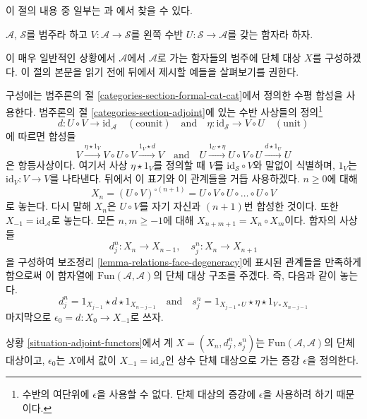\noindent
이 절의 내용 중 일부는 \cite[부록 1]{Godement}과
\cite[I 1.5]{cotangent}에서 찾을 수 있다.

\begin{situation}
\label{situation-adjoint-functors}
$\mathcal{A}$, $\mathcal{S}$를 범주라 하고
$V : \mathcal{A} \to \mathcal{S}$를 왼쪽 수반
$U : \mathcal{S} \to \mathcal{A}$를 갖는 함자라 하자.
\end{situation}

\noindent
이 매우 일반적인 상황에서 $\mathcal{A}$에서 $\mathcal{A}$로 가는
함자들의 범주에 단체 대상 $X$를 구성하겠다. 이 절의 본문을 읽기 전에
뒤에서 제시할 예들을 살펴보기를 권한다.

\medskip\noindent
구성에는 범주론의 절 \ref{categories-section-formal-cat-cat}에서 정의한
수평 합성을 사용한다. 범주론의 절 \ref{categories-section-adjoint}에
있는 수반 사상들의 정의\footnote{수반의 여단위에 $\epsilon$을 사용할
수 없다. 단체 대상의 증강에 $\epsilon$을 사용하려 하기 때문이다.}
$$
d : U \circ V \to \text{id}_\mathcal{A} \quad (\text{counit})
\quad\text{and}\quad
\eta : \text{id}_\mathcal{S} \to V \circ U \quad (\text{unit})
$$
에 따르면 합성들
\begin{equation}
\label{equation-composition}
V \xrightarrow{\eta \star 1_V} V \circ U \circ V \xrightarrow{1_V \star d} V
\quad\text{and}\quad
U \xrightarrow{1_U \star \eta} U \circ V \circ U \xrightarrow{d \star 1_U} U
\end{equation}
은 항등사상이다. 여기서 사상 $\eta \star 1_V$를 정의할 때 $V$를
$\text{id}_\mathcal{S} \circ V$와 말없이 식별하며, $1_V$는
$\text{id}_V : V \to V$를 나타낸다. 뒤에서 이 표기와 이 관계들을
거듭 사용하겠다. $n \geq 0$에 대해
$$
X_n = (U \circ V)^{\circ (n + 1)} =
U \circ V \circ U \circ \ldots \circ U \circ V
$$
로 놓는다. 다시 말해 $X_n$은 $U \circ V$를 자기 자신과
$(n + 1)$번 합성한 것이다. 또한 $X_{-1} = \text{id}_\mathcal{A}$로
놓는다. 모든 $n, m \geq -1$에 대해
$X_{n + m + 1} = X_n \circ X_m$이다. 함자의 사상들
$$
d^n_j : X_n \to X_{n - 1},\quad s^n_j : X_n \to X_{n + 1}
$$
을 구성하여 보조정리 \ref{lemma-relations-face-degeneracy}에 표시된
관계들을 만족하게 함으로써 이 함자열에
$\text{Fun}(\mathcal{A}, \mathcal{A})$의 단체 대상 구조를 주겠다.
즉, 다음과 같이 놓는다.
$$
d^n_j = 1_{X_{j - 1}} \star d \star 1_{X_{n - j - 1}}
\quad\text{and}\quad
s^n_j = 1_{X_{j - 1} \circ U} \star \eta \star 1_{V \circ X_{n - j - 1}}
$$
마지막으로 $\epsilon_0 = d : X_0 \to X_{-1}$로 쓰자.

\begin{lemma}
\label{lemma-standard-simplicial}
상황 \ref{situation-adjoint-functors}에서 계
$X = (X_n, d^n_j, s^n_j)$는
$\text{Fun}(\mathcal{A}, \mathcal{A})$의 단체 대상이고,
$\epsilon_0$는 $X$에서 값이
$X_{-1} = \text{id}_\mathcal{A}$인 상수 단체 대상으로 가는 증강
$\epsilon$을 정의한다.
\end{lemma}

